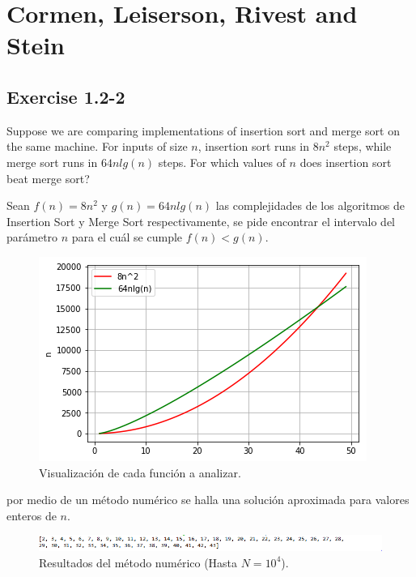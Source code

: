 \documentclass{article}
\begin{document}
\section{Cormen, Leiserson, Rivest and Stein}

\subsection{Exercise 1.2-2}
Suppose we are comparing implementations of insertion sort and merge sort on the
same machine.  For inputs of size $n$, insertion sort runs in $8n^2$ steps, while merge sort runs in $64nlg(n)$ steps.  For which values of $n$ does insertion sort beat merge sort?

Sean $f(n) = 8n^2$ y $g(n) = 64nlg(n)$ las complejidades de los algoritmos de Insertion Sort y Merge Sort respectivamente, se pide encontrar el intervalo del parámetro $n$ para el cuál se cumple $f(n) < g(n)$.

\begin{figure}[H]
  \centering
  \includegraphics[width=\textwidth]{./img/CLRS_1_1}
  \caption{Visualización de cada función a analizar.}
  \label{fig:CLRS_1_1}
\end{figure}

por medio de un método numérico se halla una solución aproximada para valores enteros de $n$.

\begin{figure}[H]
  \centering
  \includegraphics[width=\textwidth]{./img/CLRS_1_2}
  \caption{Resultados del método numérico (Hasta $N = 10^4$).}
  \label{fig:CLRS_1_2}
\end{figure}
\end{document}
